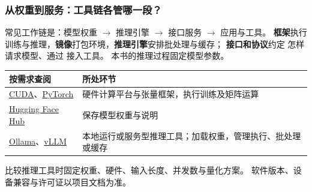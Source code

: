 \subsubsection*{从权重到服务：工具链各管哪一段？}

常见工作链是：模型权重 $\to$ 推理引擎 $\to$ 接口服务 $\to$ 应用与工具。
\textbf{框架}执行训练与推理，\textbf{镜像}打包环境，\textbf{推理引擎}安排批处理与缓存；
\textbf{接口和协议}约定  怎样请求模型、通过  接入工具。
本书的推理过程固定模型参数。

\begin{center}\small
{}
\begin{tabularx}{\linewidth}{@{}p{35mm}X@{}}\toprule
按需求查阅 & 所处环节\\\midrule
\href{https://docs.nvidia.com/cuda/cuda-programming-guide/index.html}{CUDA}、\href{https://docs.pytorch.org/docs/stable/index.html}{PyTorch} & 硬件计算平台与张量框架，执行训练及矩阵运算\\
\href{https://huggingface.co/docs/hub/index}{Hugging Face Hub} & 保存模型权重与说明\\
\href{https://docs.ollama.com/}{Ollama}、\href{https://docs.vllm.ai/}{vLLM} & 本地运行或服务型推理工具；加载权重，管理执行、批处理或缓存\\\bottomrule
\end{tabularx}
\end{center}
比较推理工具时固定权重、硬件、输入长度、并发数与量化方案。
软件版本、设备兼容与许可证以项目文档为准。

